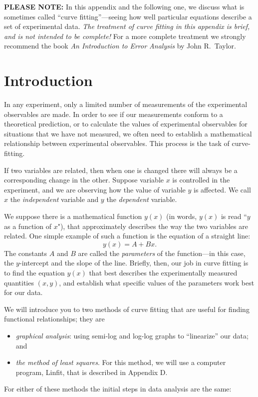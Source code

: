 \newapp
\label{datahandle}
{\bf PLEASE NOTE:}  In this appendix and the following one,
 we discuss what is sometimes
called ``curve fitting''---seeing how well particular equations
describe a set of experimental data.  {\em The treatment of curve
fitting
in this appendix is brief, and is not intended to be complete!}
For a more complete treatment we strongly recommend the book {\em An
Introduction to Error Analysis} by John R.~Taylor.

\section*{Introduction}

     In any experiment, only a limited number of measurements of
the experimental observables are made.  In order to see if our
measurements conform to a theoretical prediction, or to calculate
the values of experimental observables for situations that we
have not measured, we often need to establish a mathematical
relationship between experimental observables.  This process is the
task of curve-fitting.

    If two variables are related, then when one is changed there will
always be a corresponding change in the other.  Suppose variable $x$
is controlled in the experiment, and we are observing how the value of
variable $y$ is affected.  We call $x$  the {\em independent} variable
and $y$  the {\em dependent} variable.

We suppose there is a mathematical function $y(x)$
(in words, $y(x)$ is read ``$y$ as a function of $x$"), that
approximately
describes the way the two variables are related.  One simple example of
such a function is the equation of a straight line:
\[
y(x) = A + Bx .
\]
The constants $A$ and $B$ are called the {\em parameters} of the
function---in this case, the $y$-intercept and the slope of the line.
Briefly, then, our job in curve fitting is to
find the equation $y(x)$ that best describes the
experimentally measured quantities $(x, y)$,   and
establish what specific values of the parameters work best for our
data.

     We will introduce you to two methods of curve fitting that
are useful for finding functional relationships; they are
\begin{itemize}
	\item {\em graphical analysis}: using semi-log and log-log
graphs to ``linearize'' our data; and
%	
	\item {\em the method of least squares}.  For this method,
	we will use a computer program, Linfit, that is described in
	Appendix D.
\end{itemize}	
For either
of these methods the initial steps in data analysis are the same:

